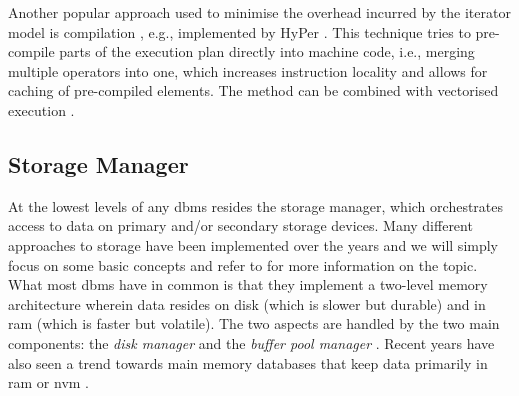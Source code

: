 Another popular approach used to minimise the overhead incurred by the iterator model is compilation \cite{Krolik:2021r3d3,Funke:2021Low}, e.g., implemented by HyPer \cite{Neumann:2011Efficiently,Neumann:2014Compiling,Blacher:2022Machine}. This technique tries to pre-compile parts of the execution plan directly into machine code, i.e., merging multiple operators into one, which increases instruction locality and allows for caching of pre-compiled elements. The method can be combined with vectorised execution \cite{Sompolski:2011Vectorization,Rosenfeld:2022Query}.

\subsection{Storage Manager}
\label{section:databases_storage_manager}
At the lowest levels of any \acrshort{dbms} resides the storage manager, which orchestrates access to data on primary and/or secondary storage devices. Many different approaches to storage have been implemented over the years and we will simply focus on some basic concepts and refer to \cite{Petrov:2019Database} for more information on the topic. What most \acrshort{dbms} have in common is that they implement a two-level memory architecture wherein data resides on disk (which is slower but durable) and in \acrshort{ram} (which is faster but volatile). The two aspects are handled by the two main components: the \emph{disk manager} and the \emph{buffer pool manager} \cite{Petrov:2019Database}. Recent years have also seen a trend towards main memory databases that keep data primarily in \acrshort{ram} \cite{Garcia:1992Main,Faerber:2017Main} or \acrfull{nvm} \cite{Arulraj:2017Build}.

